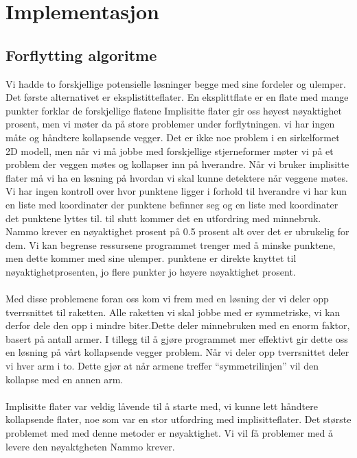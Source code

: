 \chapter{Implementasjon}
\label{chap:implementation}
\section{Forflytting algoritme}
Vi hadde to forskjellige potensielle løsninger begge med sine fordeler og ulemper. Det første alternativet er eksplistitteflater. En eksplittflate er en flate med mange punkter forklar de forskjellige flatene
Implisitte flater gir oss høyest nøyaktighet prosent, men vi møter da på store problemer under forflytningen. vi har ingen måte og håndtere kollapsende vegger. Det er ikke noe problem i en sirkelformet 2D modell, men når vi må jobbe med forskjellige stjerneformer møter vi på et problem der veggen møtes og kollapser inn på hverandre. Når vi bruker implisitte flater må vi ha en løsning på hvordan vi skal kunne detektere når veggene møtes. Vi har ingen kontroll over hvor punktene ligger i forhold til hverandre vi har kun en liste med koordinater der punktene befinner seg og en liste med koordinater det punktene lyttes til. til slutt kommer det en utfordring med  minnebruk. Nammo krever en nøyaktighet prosent på 0.5 prosent alt over det er ubrukelig for dem. Vi kan begrense ressursene programmet trenger med å minske punktene, men dette kommer med sine ulemper. punktene er direkte knyttet til nøyaktighetprosenten, jo flere punkter jo høyere nøyaktighet prosent.\\ \\
Med disse problemene foran oss kom vi frem med en løsning der vi deler opp tverrsnittet til raketten. Alle raketten vi skal jobbe med er symmetriske, vi kan derfor dele den opp i mindre biter.Dette deler minnebruken med en enorm faktor, basert på antall armer. I tillegg til å gjøre programmet mer effektivt gir dette oss en løsning på vårt kollapsende vegger problem. Når vi deler opp tverrsnittet deler vi hver arm i to. Dette gjør at når armene treffer “symmetrilinjen” vil den kollapse med en annen arm. \\ \\
 Implisitte flater var veldig låvende til å starte med, vi kunne lett håndtere kollapsende flater, noe som var en stor utfordring med implisitteflater. Det største problemet med med denne metoder er nøyaktighet. Vi vil få problemer med å levere den nøyaktgheten Nammo krever. \\ \\
